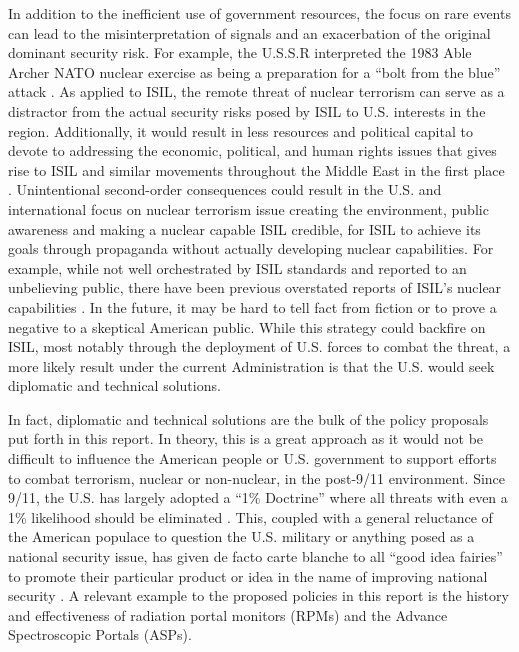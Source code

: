 \documentclass{report}
\begin{document}
In addition to the inefficient use of government resources, the focus on rare events can lead to the misinterpretation of signals and an exacerbation of the original dominant security risk.  For example, the U.S.S.R interpreted the 1983 Able Archer NATO nuclear exercise as being a preparation for a \enquote{bolt from the blue} attack \cite{pollack2014unthinkable}. As applied to ISIL, the remote threat of nuclear terrorism can serve as a distractor from the actual security risks posed by ISIL to U.S. interests in the region.  Additionally, it would result in less resources and political capital to devote to addressing the economic, political, and human rights issues that gives rise to ISIL and similar movements throughout the Middle East in the first place \cite{Morand2015}. Unintentional second-order consequences could result in the U.S. and international focus on nuclear terrorism issue creating the environment, public awareness and making a nuclear capable ISIL credible, for ISIL to achieve its goals through propaganda without actually developing nuclear capabilities.  For example, while not well orchestrated by ISIL standards and reported to an unbelieving public, there have been previous overstated reports of ISIL's nuclear capabilities \cite{Bunn2014}.  In the future, it may be hard to tell fact from fiction or to prove a negative to a skeptical American public.  While this strategy could backfire on ISIL, most notably through the deployment of U.S. forces to combat the threat, a more likely result under the current Administration is that the U.S. would seek diplomatic and technical solutions.  

In fact, diplomatic and technical solutions are the bulk of the policy proposals put forth in this report.  In theory, this is a great approach as it would not be difficult to influence the American people or U.S. government to support efforts to combat terrorism, nuclear or non-nuclear, in the post-9/11 environment. Since 9/11, the U.S. has largely adopted a \enquote{1\% Doctrine} where all threats with even a 1\% likelihood should be eliminated \cite{pollack2014unthinkable}. This, coupled with a general reluctance of the American populace to question the U.S. military or anything posed as a national security issue, has given de facto carte blanche to all \enquote{good idea fairies} to promote their particular product or idea in the name of improving national security \cite{Fallows2015}. A relevant example to the proposed policies in this report is the history and effectiveness of radiation portal monitors (RPMs) and the Advance Spectroscopic Portals (ASPs).
\end{document}
